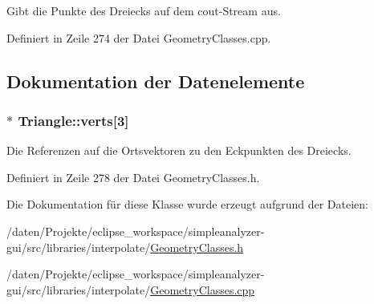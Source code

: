 Gibt die Punkte des Dreiecks auf dem cout-\/\-Stream aus. 



Definiert in Zeile 274 der Datei Geometry\-Classes.\-cpp.



\subsection{Dokumentation der Datenelemente}
\hypertarget{classTriangle_aa5ac3f568e42e746f7bd8be658e50060}{
\subsubsection[{verts}]{$\ast$ Triangle\-::verts\mbox{[}3\mbox{]}\hspace{0.3cm}{\ttfamily [private]}}}\label{classTriangle_aa5ac3f568e42e746f7bd8be658e50060}


Die Referenzen auf die Ortsvektoren zu den Eckpunkten des Dreiecks. 



Definiert in Zeile 278 der Datei Geometry\-Classes.\-h.



Die Dokumentation für diese Klasse wurde erzeugt aufgrund der Dateien\-:\begin{DoxyCompactItemize}
\item 
/daten/\-Projekte/eclipse\-\_\-workspace/simpleanalyzer-\/gui/src/libraries/interpolate/\hyperlink{GeometryClasses_8h}{Geometry\-Classes.\-h}\item 
/daten/\-Projekte/eclipse\-\_\-workspace/simpleanalyzer-\/gui/src/libraries/interpolate/\hyperlink{GeometryClasses_8cpp}{Geometry\-Classes.\-cpp}\end{DoxyCompactItemize}
